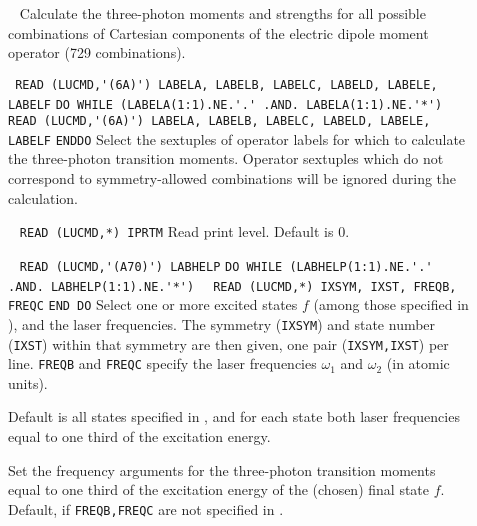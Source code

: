 \begin{description}
\item[] \verb| |\newline
Calculate the three-photon moments and strengths for all possible
combinations of Cartesian 
components of the electric dipole moment operator (729 combinations).
\item[] \verb| |\newline
\verb|READ (LUCMD,'(6A)') LABELA, LABELB, LABELC, LABELD, LABELE, LABELF|\newline
\verb|DO WHILE (LABELA(1:1).NE.'.' .AND. LABELA(1:1).NE.'*')|\newline
\verb|   READ (LUCMD,'(6A)') LABELA, LABELB, LABELC, LABELD, LABELE, LABELF|\newline
\verb|ENDDO|\newline   
Select the sextuples of operator labels for which to calculate the three-photon transition
moments. Operator sextuples which do not correspond to symmetry-allowed combinations will be
ignored during the calculation.
\item[] \verb| |\newline
\verb|READ (LUCMD,*) IPRTM|\newline
Read print level. Default is 0.
\item[] \verb| | \newline
\verb|READ (LUCMD,'(A70)') LABHELP|\newline
\verb|DO WHILE (LABHELP(1:1).NE.'.' .AND. LABHELP(1:1).NE.'*')|\newline
\verb|  READ (LUCMD,*) IXSYM, IXST, FREQB, FREQC|\newline
\verb|END DO| \newline
Select one or more excited states $f$ (among those specified
in ), and the laser frequencies.
The symmetry (\verb+IXSYM+) and state number (\verb+IXST+)
within that symmetry are then given,
one pair (\verb|IXSYM,IXST|) per line.
\verb+FREQB+ and \verb+FREQC+ specify the 
laser frequencies $\omega_1$ and $\omega_2$ (in atomic units).


Default is all states specified in , and for each state
both laser frequencies equal to one third of the excitation energy.

%
\item[]
Set the frequency arguments for the three-photon transition moments
equal to one third of the excitation energy of the (chosen) 
final state $f$. Default, if \verb+FREQB,FREQC+ are not specified 
in .
%
\end{description}
